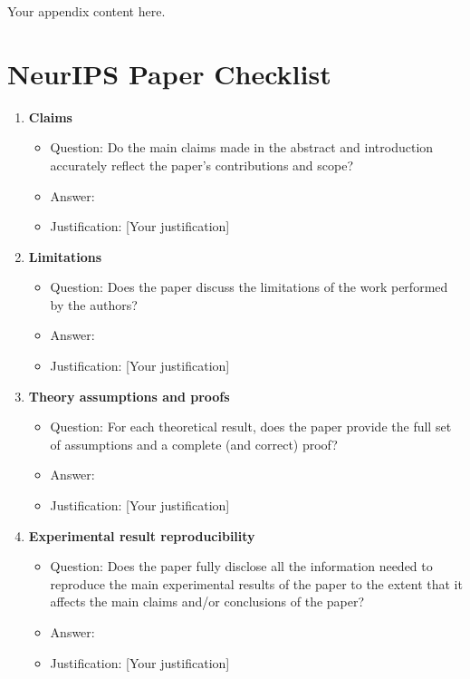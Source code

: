 \documentclass{article}
\begin{document}
Your appendix content here.

\section*{NeurIPS Paper Checklist}

\begin{enumerate}
  \item \textbf{Claims}
  \begin{itemize}
    \item Question: Do the main claims made in the abstract and introduction accurately reflect the paper's contributions and scope?
    \item Answer: \answerYes{}
    \item Justification: [Your justification]
  \end{itemize}

  \item \textbf{Limitations}
  \begin{itemize}
    \item Question: Does the paper discuss the limitations of the work performed by the authors?
    \item Answer: \answerYes{}
    \item Justification: [Your justification]
  \end{itemize}

  \item \textbf{Theory assumptions and proofs}
  \begin{itemize}
    \item Question: For each theoretical result, does the paper provide the full set of assumptions and a complete (and correct) proof?
    \item Answer: \answerYes{}
    \item Justification: [Your justification]
  \end{itemize}

  \item \textbf{Experimental result reproducibility}
  \begin{itemize}
    \item Question: Does the paper fully disclose all the information needed to reproduce the main experimental results of the paper to the extent that it affects the main claims and/or conclusions of the paper?
    \item Answer: \answerYes{}
    \item Justification: [Your justification]
  \end{itemize}


\end{enumerate}
\end{document}
